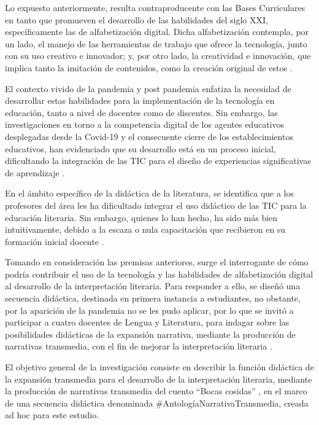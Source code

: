 \documentclass[spanish]{textolivre}
\begin{document}
Lo expuesto anteriormente, resulta contraproducente con las Bases Curriculares en tanto que promueven el desarrollo de las habilidades del siglo XXI, específicamente las de alfabetización digital. Dicha alfabetización contempla, por un lado, el manejo de las herramientas de trabajo que ofrece la tecnología, junto con su uso creativo e innovador; y, por otro lado, la creatividad e innovación, que implica tanto la imitación de contenidos, como la creación original de estos \cite{ministerio_de_educacion_bases_2019}.  

El contexto vivido de la pandemia y post pandemia enfatiza la necesidad de desarrollar estas habilidades para la implementación de la tecnología en educación, tanto a nivel de docentes como de discentes. Sin embargo, las investigaciones en torno a la competencia digital de los agentes educativos desplegadas desde la Covid-19 y el consecuente cierre de los establecimientos educativos, han evidenciado que su desarrollo está en un proceso inicial, dificultando la integración de las TIC para el diseño de experiencias significativas de aprendizaje \cite{ramos-pla_formacion_2022,aguilar_cuesta_covid-19_2022,guillen-gamez_formacion_2022,area_tecnologias_2021}.

En el ámbito específico de la didáctica de la literatura, se identifica que a los profesores del área les ha dificultado integrar el uso didáctico de las TIC para la educación literaria. Sin embargo, quienes lo han hecho, ha sido más bien intuitivamente, debido a la escaza o nula capacitación que recibieron en su formación inicial docente \cite{suazo_munoz_aproximacion_2022,gonzalez_integracion_2018}. 

Tomando en consideración las premisas anteriores, surge el interrogante de cómo podría contribuir el uso de la tecnología y las habilidades de alfabetización digital al desarrollo de la interpretación literaria. Para responder a ello, se diseñó una secuencia didáctica, destinada en primera instancia a estudiantes, no obstante, por la aparición de la pandemia no se les pudo aplicar, por lo que se invitó a participar a cuatro docentes de Lengua y Literatura, para indagar sobre las posibilidades didácticas de la expansión narrativa, mediante la producción de narrativas transmedia, con el fin de mejorar la interpretación literaria \cite{ballester_roca_clasicos_2021}.

El objetivo general de la investigación consiste en describir la función didáctica de la expansión transmedia para el desarrollo de la interpretación literaria, mediante la producción de narrativas transmedia del cuento “Bocas cosidas” \cite{barros_bocas_2015}, en el marco de una secuencia didáctica denominada \#AntologíaNarrativaTransmedia, creada ad hoc para este estudio. 
\end{document}
